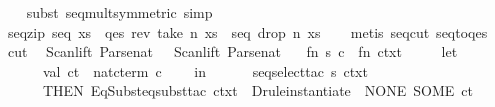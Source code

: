 \begin{isabellebody}
%
\isadelimproof
\ \ %
\endisadelimproof
%
\isatagproof
{}\isamarkupfalse%
\ {}subst\ seq{}mult{}symmetric{}{}\ simp{}%
\endisatagproof
{\isafoldproof}%
%
\isadelimproof
\isanewline
%
\endisadelimproof
\isanewline
{}\isamarkupfalse%
\ seq{}zip{}\ {}seq\ xs\ {}\ qes\ {}rev\ {}take\ n\ xs{}{}\ {}\ seq\ {}drop\ n\ xs{}{}\isanewline
%
\isadelimproof
\ \ %
\endisadelimproof
%
\isatagproof
{}\isamarkupfalse%
\ {}metis\ seq{}cut\ seq{}to{}qes{}%
\endisatagproof
{\isafoldproof}%
%
\isadelimproof
\isanewline
%
\endisadelimproof
%
\isadelimML
\isanewline
%
\endisadelimML
%
\isatagML
{}\isamarkupfalse%
\ cut\ {}\ {}\isanewline
Scan{}lift\ Parse{}nat\ \ {}{}\ Scan{}lift\ Parse{}nat\ {}{}\isanewline
\ \ {}fn\ {}s{}\ c{}\ {}{}\ fn\ ctxt\ {}{}\isanewline
\ \ \ \ let\isanewline
\ \ \ \ \ \ val\ ct\ {}\ nat{}cterm\ c\isanewline
\ \ \ \ in\isanewline
\ \ \ \ \ \ seq{}select{}tac\ s\ ctxt\ {}\isanewline
\ \ \ \ \ \ THEN\ EqSubst{}eqsubst{}tac\ ctxt\ {}{}{}\ {}Drule{}instantiate{}\ {}{}\ {}NONE{}\ SOME\ ct{}\ %

\end{isabellebody}
